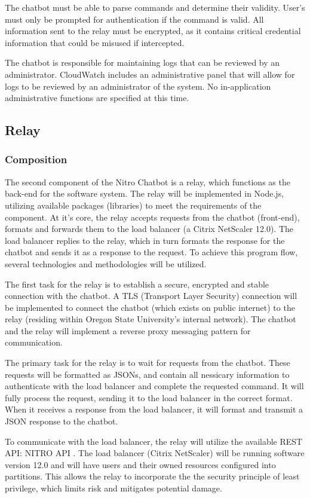 \documentclass[onecolumn, draftclsnofoot,10pt, compsoc]{IEEEtran}
\begin{document}
The chatbot must be able to parse commands and determine their validity.
User's must only be prompted for authentication if the command is valid.
All information sent to the relay must be encrypted, as it contains critical credential information that could be misused if intercepted.

The chatbot is responsible for maintaining logs that can be reviewed by an administrator.
CloudWatch includes an administrative panel that will allow for logs to be reviewed by an administrator of the system.
No in-application administrative functions are specified at this time.

\subsection{Relay}
\subsubsection{Composition}
The second component of the Nitro Chatbot is a relay, which functions as the back-end for the software system.
The relay will be implemented in Node.js, utilizing available packages (libraries) to meet the requirements of the component.
At it's core, the relay accepts requests from the chatbot (front-end), formats and forwards them to the load balancer (a Citrix NetScaler 12.0).
The load balancer replies to the relay, which in turn formats the response for the chatbot and sends it as a response to the request.
To achieve this program flow, several technologies and methodologies will be utilized.

The first task for the relay is to establish a secure, encrypted and stable connection with the chatbot.
A TLS (Transport Layer Security) connection will be implemented to connect the chatbot (which exists on public internet) to the relay (residing within Oregon State University's internal network).
The chatbot and the relay will implement a reverse proxy messaging pattern for communication.

The primary task for the relay is to wait for requests from the chatbot.
These requests will be formatted as JSONs, and contain all nessicary information to authenticate with the load balancer and complete the requested command.
It will fully process the request, sending it to the load balancer in the correct format.
When it receives a response from the load balancer, it will format and transmit a JSON response to the chatbot.

To communicate with the load balancer, the relay will utilize the available REST API: NITRO API \cite{nitro}.
The load balancer (Citrix NetScaler) will be running software version 12.0 and will have users and their owned resources configured into partitions.
This allows the relay to incorporate the the security principle of least privilege, which limits risk and mitigates potential damage.
\end{document}
